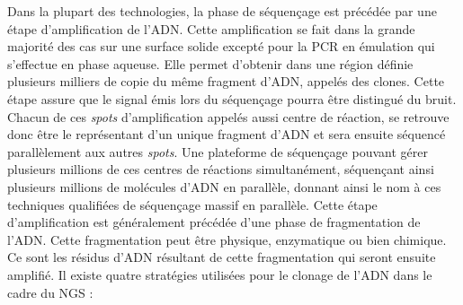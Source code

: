 \documentclass[12pt,twoside]{reedthesis}
\theoremstyle{definition}
\theoremstyle{definition}
\theoremstyle{remark}
\begin{document}
  Dans la plupart des technologies, la phase de séquençage est précédée
  par une étape d'amplification de l'ADN. Cette amplification se fait dans
  la grande majorité des cas sur une surface solide excepté pour la PCR en
  émulation qui s'effectue en phase aqueuse. Elle permet d'obtenir dans
  une région définie plusieurs milliers de copie du même fragment d'ADN,
  appelés des clones. Cette étape assure que le signal émis lors du
  séquençage pourra être distingué du bruit. Chacun de ces \emph{spots}
  d'amplification appelés aussi centre de réaction, se retrouve donc être
  le représentant d'un unique fragment d'ADN et sera ensuite séquencé
  parallèlement aux autres \emph{spots}. Une plateforme de séquençage
  pouvant gérer plusieurs millions de ces centres de réactions
  simultanément, séquençant ainsi plusieurs millions de molécules d'ADN en
  parallèle, donnant ainsi le nom à ces techniques qualifiées de
  séquençage massif en parallèle. Cette étape d'amplification est
  généralement précédée d'une phase de fragmentation de l'ADN. Cette
  fragmentation peut être physique, enzymatique ou bien chimique. Ce sont
  les résidus d'ADN résultant de cette fragmentation qui seront ensuite
  amplifié. Il existe quatre stratégies utilisées pour le clonage de l'ADN
  dans le cadre du NGS :
  
\end{document}

